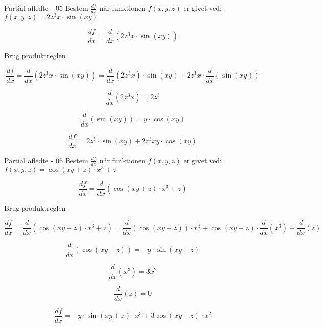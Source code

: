 \documentclass{article}
\begin{document}
\begin{exercise}{Partial afledte - 05}
	Bestem $\frac{df}{dx}$ når funktionen $f(x,y,z)$ er givet ved:
	$f(x,y,z) = 2z^3x  \cdot \sin(xy)$ 
	
	
	\hint
	\[
	\frac{df}{dx} = \frac{d}{dx} \left(2z^3x  \cdot \sin(xy)\right) 
	\]
	
	\hint
	Brug produktreglen
	
	\hint
	\[
	\frac{df}{dx} = \frac{d}{dx} \left( 2z^3x  \cdot \sin(xy)\right) = \frac{d}{dx} \left( 2z^3x\right) \cdot \sin(xy) + 2z^3x \cdot \frac{d}{dx}\left( \sin(xy)\right)
	\]
	
	\hint
	\[
	\frac{d}{dx} \left( 2z^3x\right) = 2z^3
	\]
	
	\hint
	\[
	\frac{d}{dx}\left( \sin(xy)\right) = y \cdot \cos(xy)
	\]
	
	\hint
	\[
	\frac{df}{dx}  = 2z^3 \cdot \sin(xy) + 2z^3xy \cdot \cos(xy) 
	\]
	
	
\end{exercise}

\begin{exercise}{Partial afledte - 06}
	Bestem $\frac{df}{dx}$ når funktionen $f(x,y,z)$ er givet ved:
	$f(x,y,z) = \cos(xy+z)  \cdot x^3 + z$ 
	
	
	\hint
	\[
	\frac{df}{dx} = \frac{d}{dx} \left(  \cos(xy+z)  \cdot x^3 + z\right) 
	\]
	
	\hint
	Brug produktreglen
	
	\hint
	\[
	\frac{df}{dx} = \frac{d}{dx} \left( \cos(xy+z)  \cdot x^3 + z\right) = \frac{d}{dx} \left(\cos(xy+z) \right) \cdot x^3 + \cos(xy+z) \cdot \frac{d}{dx}\left( x^3\right) + \frac{d}{dx} (z)
	\]
	
	\hint
	\[
	\frac{d}{dx} \left( \cos(xy+z)\right) = -y \cdot \sin(xy+z)
	\]
	
	\hint
	\[
	\frac{d}{dx}\left( x^3\right) = 3x^2
	\]
	
	\hint
	\[
	\frac{d}{dx} (z) = 0
	\]
	
	\hint
	\[
	\frac{df}{dx}  = -y \cdot \sin(xy+z) \cdot x^3 + 3 \cos(xy+z) \cdot x^2
	\]
	
	
\end{exercise}
\end{document}
